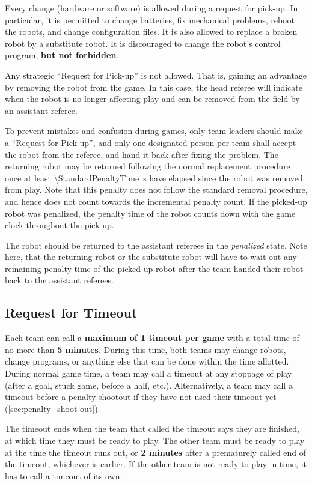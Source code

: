 Every change (hardware or software) is allowed during a request for pick-up. In particular,
it is permitted to change batteries, fix mechanical problems, reboot the robots, and change configuration files.
It is also allowed to replace a broken robot by a substitute robot.
It is discouraged to change the robot's control program, \textbf{but not forbidden}.

Any strategic ``Request for Pick-up'' is not allowed.
That is, gaining an advantage by removing the robot from the game.
In this case, the head referee will indicate when the robot is no longer affecting play and can be removed from the field by an assistant referee.

To prevent mistakes and confusion during games, only team leaders should make a ``Request for Pick-up'', and only one designated person per team shall accept the robot from the referee, and hand it back after fixing the problem.
The returning robot may be returned following the normal replacement procedure once at least \qty{\StandardPenaltyTime}{\second} have elapsed since the robot was removed from play.
Note that this penalty does not follow the standard removal procedure, and hence does not count towards the incremental penalty count.
If the picked-up robot was penalized, the penalty time of the robot counts down with the game clock throughout the pick-up.

The robot should be returned to the assistant referees in the \emph{penalized} state.
Note here, that the returning robot or the substitute robot will have to wait out any remaining penalty time of the picked up robot after the team handed their robot back to the assistant referees.

\subsection{Request for Timeout}
\label{sec:request_for_timeout}

Each team can call a \textbf{maximum of 1 timeout per game} with a total time of no more than \textbf{5 minutes}. During this time, both teams may change robots, change programs, or anything else that can be done within the time allotted.  During normal game time, a team may call a timeout at any stoppage of play (after a goal, stuck game, before a half, etc.). Alternatively, a team may call a timeout before a penalty shootout if they have not used their timeout yet (\cf \cref{sec:penalty_shoot-out}).

The timeout ends when the team that called the timeout says they are finished, at which time they must be ready to play. The other team must be ready to play at the time the timeout runs out, or \textbf{2 minutes} after a prematurely called end of the timeout, whichever is earlier. If the other team is not ready to play in time, it has to call a timeout of its own.

